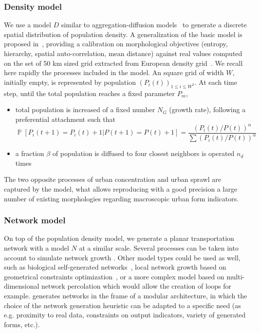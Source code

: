 \documentclass{article}
\DeclareMathOperator{\Proba}{\mathbb{P}}
\newcommand{\Pb}[1]{\ensuremath{\Proba\!\left[#1\right]}}
\begin{document}
\subsubsection*{Density model}

We use a model $D$ similar to aggregation-diffusion models~\cite{batty2006hierarchy} to generate a discrete spatial distribution of population density. A generalization of the basic model is proposed in~\cite{raimbault2018calibration}, providing a calibration on morphological objectives (entropy, hierarchy, spatial auto-correlation, mean distance) against real values computed on the set of 50 km sized grid extracted from European density grid~\cite{eurostat}. We recall here rapidly the processes included in the model. An square grid of width $W$, initially empty, is represented by population $(P_i(t))_{1\leq i\leq W^2}$. At each time step, until the total population reaches a fixed parameter $P_m$,
\begin{itemize}
\item total population is increased of a fixed number $N_G$ (growth rate), following a preferential attachment such that 
\begin{equation} 
\Pb{P_i(t+1)=P_i(t)+1|P(t+1)=P(t)+1}=\frac{(P_i(t)/P(t))^{\alpha}}{\sum(P_i(t)/P(t))^{\alpha}}
\end{equation}
\item a fraction $\beta$ of population is diffused to four closest neighbors is operated $n_d$ times
\end{itemize}


The two opposite processes of urban concentration and urban sprawl are captured by the model, what allows reproducing with a good precision a large number of existing morphologies regarding macroscopic urban form indicators.


\subsubsection*{Network model}


On top of the population density model, we generate a planar transportation network with a model $N$ at a similar scale. Several processes can be taken into account to simulate network growth \cite{raimbault2018multi}. Other model types could be used as well, such as biological self-generated networks~\cite{tero2010rules}, local network growth based on geometrical constraints optimization~\cite{courtat2011mathematics}, or a more complex model based on multi-dimensional network percolation \cite{raimbault2019multi} which would allow the creation of loops for example. \cite{raimbault2018multi} generates networks in the frame of a modular architecture, in which the choice of the network generation heuristic can be adapted to a specific need (as e.g. proximity to real data, constraints on output indicators, variety of generated forms, etc.).
\end{document}
